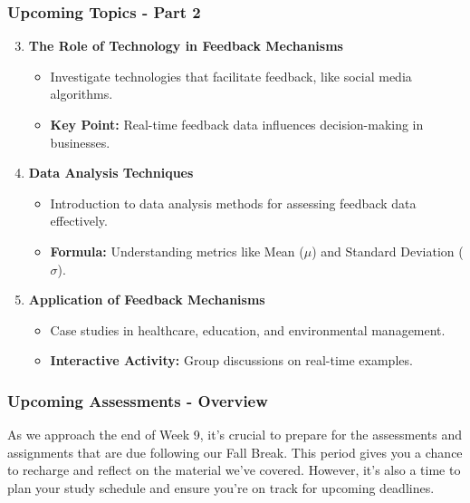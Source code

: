 \documentclass[aspectratio=169]{beamer}
\begin{document}
\begin{frame}[fragile]
    \frametitle{Upcoming Topics - Part 2}
    \begin{enumerate}
        \setcounter{enumi}{2} %
        \item \textbf{The Role of Technology in Feedback Mechanisms}
            \begin{itemize}
                \item Investigate technologies that facilitate feedback, like social media algorithms.
                \item \textbf{Key Point:} Real-time feedback data influences decision-making in businesses.
            \end{itemize}

        \item \textbf{Data Analysis Techniques}
            \begin{itemize}
                \item Introduction to data analysis methods for assessing feedback data effectively.
                \item \textbf{Formula:} Understanding metrics like Mean ($\mu$) and Standard Deviation ($\sigma$).
            \end{itemize}

        \item \textbf{Application of Feedback Mechanisms}
            \begin{itemize}
                \item Case studies in healthcare, education, and environmental management.
                \item \textbf{Interactive Activity:} Group discussions on real-time examples.
            \end{itemize}
    \end{enumerate}
\end{frame}

\begin{frame}[fragile]
    \frametitle{Upcoming Assessments - Overview}
    As we approach the end of Week 9, it's crucial to prepare for the assessments and assignments that are due following our Fall Break. This period gives you a chance to recharge and reflect on the material we've covered. However, it’s also a time to plan your study schedule and ensure you’re on track for upcoming deadlines.
\end{frame}
\end{document}
